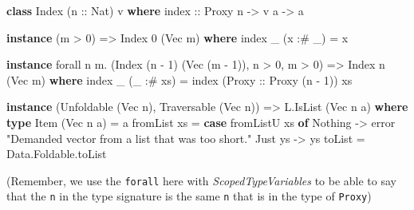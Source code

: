 \documentclass[]{article}
\newenvironment{Shaded}{}{}
\newcommand{\KeywordTok}[1]{\textcolor[rgb]{0.00,0.44,0.13}{\textbf{{#1}}}}
\newcommand{\DataTypeTok}[1]{\textcolor[rgb]{0.56,0.13,0.00}{{#1}}}
\newcommand{\DecValTok}[1]{\textcolor[rgb]{0.25,0.63,0.44}{{#1}}}
\newcommand{\StringTok}[1]{\textcolor[rgb]{0.25,0.44,0.63}{{#1}}}
\newcommand{\OtherTok}[1]{\textcolor[rgb]{0.00,0.44,0.13}{{#1}}}
\newcommand{\FunctionTok}[1]{\textcolor[rgb]{0.02,0.16,0.49}{{#1}}}
\newcommand{\NormalTok}[1]{{#1}}
\begin{document}
\begin{Shaded}
\begin{Highlighting}[]
\KeywordTok{class} \DataTypeTok{Index} \NormalTok{(}\OtherTok{n ::} \DataTypeTok{Nat}\NormalTok{) v }\KeywordTok{where}
\OtherTok{    index ::} \DataTypeTok{Proxy} \NormalTok{n }\OtherTok{->} \NormalTok{v a }\OtherTok{->} \NormalTok{a}

\KeywordTok{instance} \NormalTok{(m }\FunctionTok{>} \DecValTok{0}\NormalTok{) }\OtherTok{=>} \DataTypeTok{Index} \DecValTok{0} \NormalTok{(}\DataTypeTok{Vec} \NormalTok{m) }\KeywordTok{where}
    \NormalTok{index _ (x }\FunctionTok{:#} \NormalTok{_) }\FunctionTok{=} \NormalTok{x}

\KeywordTok{instance} \NormalTok{forall n m}\FunctionTok{.} \NormalTok{(}\DataTypeTok{Index} \NormalTok{(n }\FunctionTok{-} \DecValTok{1}\NormalTok{) (}\DataTypeTok{Vec} \NormalTok{(m }\FunctionTok{-} \DecValTok{1}\NormalTok{)), n }\FunctionTok{>} \DecValTok{0}\NormalTok{, m }\FunctionTok{>} \DecValTok{0}\NormalTok{) }\OtherTok{=>} \DataTypeTok{Index} \NormalTok{n (}\DataTypeTok{Vec} \NormalTok{m) }\KeywordTok{where}
    \NormalTok{index _ (_ }\FunctionTok{:#} \NormalTok{xs) }\FunctionTok{=} \NormalTok{index (}\DataTypeTok{Proxy}\OtherTok{ ::} \DataTypeTok{Proxy} \NormalTok{(n }\FunctionTok{-} \DecValTok{1}\NormalTok{)) xs}

\KeywordTok{instance} \NormalTok{(}\DataTypeTok{Unfoldable} \NormalTok{(}\DataTypeTok{Vec} \NormalTok{n), }\DataTypeTok{Traversable} \NormalTok{(}\DataTypeTok{Vec} \NormalTok{n)) }\OtherTok{=>} \DataTypeTok{L.IsList} \NormalTok{(}\DataTypeTok{Vec} \NormalTok{n a) }\KeywordTok{where}
    \KeywordTok{type} \DataTypeTok{Item} \NormalTok{(}\DataTypeTok{Vec} \NormalTok{n a) }\FunctionTok{=} \NormalTok{a}
    \NormalTok{fromList xs }\FunctionTok{=} \KeywordTok{case} \NormalTok{fromListU xs }\KeywordTok{of}
                    \DataTypeTok{Nothing} \OtherTok{->} \NormalTok{error }\StringTok{"Demanded vector from a list that was too short."}
                    \DataTypeTok{Just} \NormalTok{ys }\OtherTok{->} \NormalTok{ys}
    \NormalTok{toList      }\FunctionTok{=} \NormalTok{Data.Foldable.toList}
\end{Highlighting}
\end{Shaded}

(Remember, we use the \texttt{forall} here with \emph{ScopedTypeVariables} to be
able to say that the \texttt{n} in the type signature is the same \texttt{n}
that is in the type of \texttt{Proxy})
\end{document}

